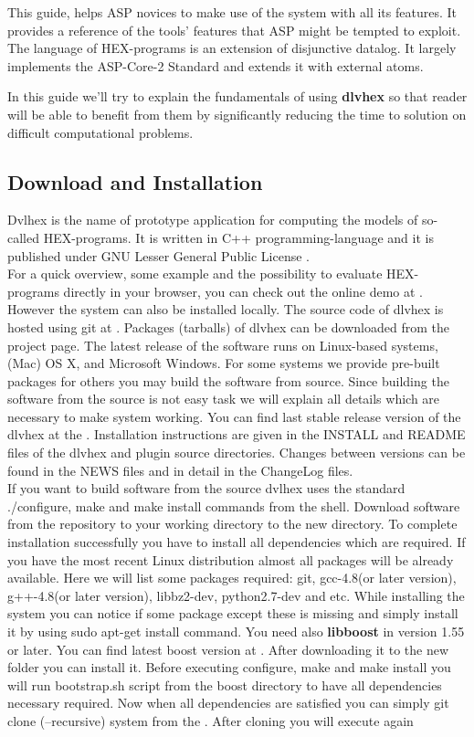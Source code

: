 \documentclass[14pt,a4paper, titlepage]{article}
\begin{document}
This guide, helps ASP novices to make use of the system with all its features. It provides a reference of the tools' features that ASP might be tempted to exploit. The language of HEX-programs is an extension of disjunctive datalog. It largely implements the ASP-Core-2 Standard \cite{ref} and extends it with external atoms. 

In this guide we'll try to explain the fundamentals of using \textbf{dlvhex} so that reader will be able to benefit from them by significantly reducing the time to solution on difficult computational problems. 


 
\subsection{Download and Installation}
Dvlhex is the name of prototype application for computing the models of so-called HEX-programs. It is written in C++ programming-language and it is published under GNU Lesser General Public License \cite{licnc}.\bigskip \\For a quick overview, some example and the possibility to evaluate HEX-programs directly in your browser, you can check out the online demo at \cite{onlinedemo}. However the system can also be installed locally. The source code of dlvhex is hosted using git at \cite{git}. Packages (tarballs) of dlvhex can be downloaded from the \cite{sourceforge} project page. The latest release of the software runs on Linux-based systems, (Mac) OS X, and Microsoft Windows. For some systems we provide pre-built packages \cite{prebuilt}  for others you may build the software from source. Since building the software from the source is not easy task we will explain all details which are necessary to make system working. You can find last stable release version of the dlvhex at the \cite{sourceforge}. Installation instructions are given in the INSTALL and README files of the dlvhex and plugin source directories. Changes between versions can be found in the NEWS files and in detail in the ChangeLog files.\bigskip \\If you want to build software from the source dvlhex uses the standard ./configure, make and make install commands from the shell. Download software from the repository to your working directory to the new directory. To complete installation successfully you have to install all dependencies which are required. If you have the most recent Linux distribution almost all packages will be already available. Here we will list some packages required: git, gcc-4.8(or later version), g++-4.8(or later version), libbz2-dev, python2.7-dev and etc. While installing the system you can notice if some package except these is missing and simply install it by using sudo apt-get install command. You need also \textbf{libboost} in version 1.55 or later. You can find latest boost version at \cite{boost}. After downloading it to the new folder you can install it. Before executing configure, make and make install you will run bootstrap.sh script from the boost directory to have all dependencies necessary required. Now when all dependencies are satisfied you can simply git clone (--recursive) system from the \cite{hexhex}. After cloning you will execute again 
\end{document}
